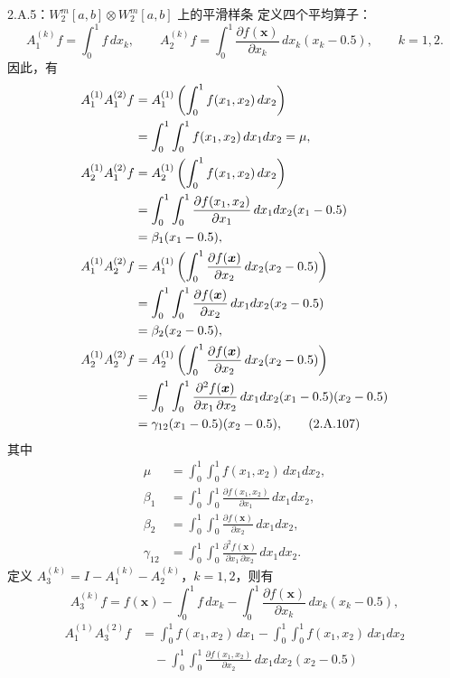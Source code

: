 \begin{bookexample}{2.A.5：$W_2^m[a,b]\otimes W_2^m[a,b]$ 上的平滑样条}
定义四个平均算子：
\[
A_1^{(k)}f=\int_0^1f\,dx_k,
\qquad
A_2^{(k)}f=\int_0^1\frac{\partial f(\boldsymbol x)}{\partial x_k}
 \,dx_k(x_k-0.5),\qquad k=1,2.
\]
因此，有
\begingroup
\allowdisplaybreaks[2]
\begin{align}
A_1^{(1)}A_1^{(2)}f
 &=A_1^{(1)}\left(\int_0^1f(x_1,x_2)\,dx_2\right)\notag\\
 &=\int_0^1\int_0^1f(x_1,x_2)\,dx_1dx_2=\mu,\notag\\
A_2^{(1)}A_1^{(2)}f
 &=A_2^{(1)}\left(\int_0^1f(x_1,x_2)\,dx_2\right)\notag\\
 &=\int_0^1\int_0^1\frac{\partial f(x_1,x_2)}{\partial x_1}
    \,dx_1dx_2(x_1-0.5)\notag\\
 &=\beta_1(x_1-0.5),\notag\\
A_1^{(1)}A_2^{(2)}f
 &=A_1^{(1)}\left(\int_0^1
   \frac{\partial f(\boldsymbol x)}{\partial x_2}
   \,dx_2(x_2-0.5)\right)\notag\\
 &=\int_0^1\int_0^1\frac{\partial f(\boldsymbol x)}{\partial x_2}
   \,dx_1dx_2(x_2-0.5)\notag\\
 &=\beta_2(x_2-0.5),\notag\\
A_2^{(1)}A_2^{(2)}f
 &=A_2^{(1)}\left(\int_0^1
   \frac{\partial f(\boldsymbol x)}{\partial x_2}
   \,dx_2(x_2-0.5)\right)\notag\\
 &=\int_0^1\int_0^1
   \frac{\partial^2 f(\boldsymbol x)}{\partial x_1\,\partial x_2}
   \,dx_1dx_2(x_1-0.5)(x_2-0.5)\notag\\
 &=\gamma_{12}(x_1-0.5)(x_2-0.5),\tag{2.A.107}
\end{align}
\endgroup
其中
\[
\begin{aligned}
\mu&=\int_0^1\int_0^1f(x_1,x_2)\,dx_1dx_2,\\
\beta_1&=\int_0^1\int_0^1
       \frac{\partial f(x_1,x_2)}{\partial x_1}\,dx_1dx_2,\\
\beta_2&=\int_0^1\int_0^1
       \frac{\partial f(\boldsymbol x)}{\partial x_2}\,dx_1dx_2,\\
\gamma_{12}&=\int_0^1\int_0^1
       \frac{\partial^2f(\boldsymbol x)}{\partial x_1\,\partial x_2}
       \,dx_1dx_2.
\end{aligned}
\]
定义 $A_3^{(k)}=I-A_1^{(k)}-A_2^{(k)}$，$k=1,2$，则有
\[
A_3^{(k)}f=f(\boldsymbol x)-\int_0^1f\,dx_k
 -\int_0^1\frac{\partial f(\boldsymbol x)}{\partial x_k}
     \,dx_k(x_k-0.5),
\]
\[
\begin{aligned}
A_1^{(1)}A_3^{(2)}f
 &=\int_0^1f(x_1,x_2)\,dx_1
   -\int_0^1\int_0^1f(x_1,x_2)\,dx_1dx_2\\
 &\quad-\int_0^1\int_0^1
    \frac{\partial f(x_1,x_2)}{\partial x_2}\,dx_1dx_2(x_2-0.5)\\

\end{aligned}\]
\end{bookexample}
